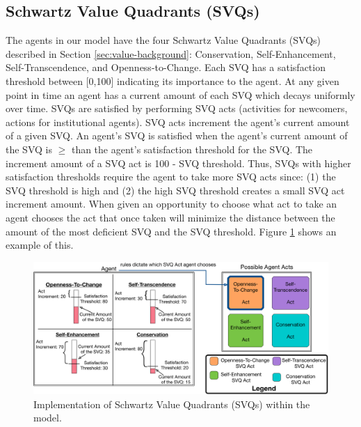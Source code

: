 \documentclass{scspaperproc}
\theoremstyle{scsthe}
\begin{document}
\subsection{Schwartz Value Quadrants (SVQs)} 
The agents in our model have the four Schwartz Value Quadrants (SVQs) described in Section \ref{sec:value-background}: Conservation, Self-Enhancement, Self-Transcendence, and Openness-to-Change. Each SVQ has a satisfaction threshold between [0,100] indicating its importance to the agent. At any given point in time an agent has a current amount of each SVQ which decays uniformly over time. SVQs are satisfied by performing SVQ acts (activities for newcomers, actions for institutional agents). SVQ acts increment the agent's current amount of a given SVQ. An agent's SVQ is satisfied when the agent's current amount of the SVQ is $\geq$ than the agent's satisfaction threshold for the SVQ. The increment amount of a SVQ act is 100 - SVQ threshold. Thus, SVQs with higher satisfaction thresholds require the agent to take more SVQ acts since: (1) the SVQ threshold is high and (2) the high SVQ threshold creates a small SVQ act increment amount. When given an opportunity to choose what act to take an agent chooses the act that once taken will minimize the distance between the amount of the most deficient SVQ and the SVQ threshold. Figure \ref{fig:agent-val} shows an example of this.

\begin{figure}[htb]
{
\centering
\includegraphics[width=0.65\columnwidth]{Agent-Value-In-Model.png}
\caption{Implementation of Schwartz Value Quadrants (SVQs) within the model.}
\label{fig:agent-val}
}
\end{figure}
\end{document}
